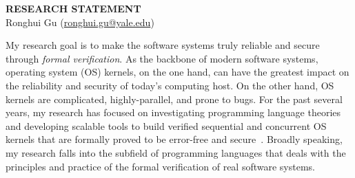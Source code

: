 \documentclass[a4paper, 10pt]{article}
\newcommand*{\email}[1]{\normalsize\href{mailto:#1}{#1}}
\begin{document}
\thispagestyle{fancy}
\lhead{}
\rhead{}
\renewcommand{\headrulewidth}{0pt} 
\renewcommand{\footrulewidth}{0pt} 


\pagestyle{fancy}
\lhead{\textcolor{gray}{\it Ronghui Gu}}
\rhead{\textcolor{gray}{\thepage/\totalpages{}}}

\begin{small}

\begin{center}
{\LARGE \bf RESEARCH STATEMENT}\\
\vspace*{0.2cm}
{\normalsize Ronghui Gu (\email{ronghui.gu@yale.edu})}
\end{center}



My research goal is to make the software systems truly reliable and secure through \emph{formal verification}.
As the backbone of 
modern software systems,
operating system (OS) kernels,
on the one hand,
 can have the greatest impact on the reliability and security of today's computing host.
On the other hand, OS kernels are complicated, highly-parallel, and prone to bugs.  For the past several years,  my research has focused on investigating programming language theories and developing scalable tools to build verified sequential and concurrent OS kernels that are formally proved to be error-free and secure~\cite{popl15-gu, osdi16-gu, pldi16-security, pldi16-device}.
Broadly speaking, my research
falls into 
the subfield of programming languages that
deals with the principles and practice of  the formal verification
of real software systems.



\end{small}
\end{document}
